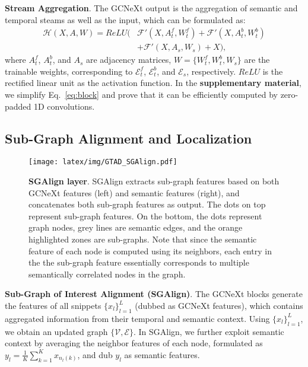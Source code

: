 \documentclass[10pt,twocolumn,letterpaper]{article}
\newcommand{\F}{\mathcal{F}}
\newcommand{\E}{\mathcal{E}}
\renewcommand{\H}{\mathcal{H}}
\begin{document}
\noindent \textbf{Stream Aggregation}. The GCNeXt output is the aggregation of semantic and temporal steams as well as the input,
which can be formulated as: 
\begin{align} \label{eq:block}
   \H(X,A,W)=ReLU(&\F'{(X,A_t^f,W_t^f)}+\F'{(X,A_t^b,W_t^b)}\nonumber \\
   &+ \F'{(X,A_s,W_s)}+X ),
\end{align}
where $A_t^f$, $A_t^b$, and $A_s$ are adjacency matrices, $W = \{W_t^f, W_t^b, W_s\}$ are the trainable weights, corresponding to  $\E_t^f$, $\E_t^b$, and $\E_s$, respectively. $ReLU$ is the rectified linear unit as the activation function. 
In the \textbf{supplementary material}, we simplify  Eq.~\ref{eq:block}  and prove that it can be efficiently computed by zero-padded 1D convolutions.





\subsection{Sub-Graph Alignment and Localization} \label{subsec: SGAlign}

\begin{figure}
    \centering
    \texttt{[image: latex/img/GTAD\_SGAlign.pdf]}
    \caption{\textbf{SGAlign layer}. SGAlign extracts sub-graph features based on both GCNeXt features (left) and semantic features (right), and concatenates both sub-graph features as output. The dots on top represent sub-graph features. On the bottom, the dots represent graph nodes, grey lines are  semantic edges, and the orange highlighted zones are sub-graphs. Note that since the semantic feature of each node is computed using its neighbors, each entry in the the sub-graph feature essentially corresponds to multiple semantically correlated nodes in the graph.
}
    \label{fig:ga}
\end{figure}

\noindent
\textbf{Sub-Graph of Interest Alignment (SGAlign)}. 
The GCNeXt blocks generate the features of all snippets $\{x_l\}_{l=1}^L$ (dubbed as GCNeXt features), which contains aggregated information from their temporal and semantic context. Using $\{x_l\}_{l=1}^L$, we obtain an updated graph $\{\mathcal{V}, \mathcal{E}\}$. In SGAlign, we further exploit semantic context  
by averaging the neighbor features of each node, formulated as $y_l = \frac1K\sum_{k=1}^Kx_{n_l(k)}$, and dub $y_l$  as semantic features.
\end{document}
